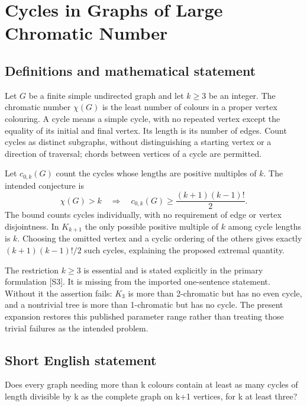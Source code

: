 \documentclass[11pt,a4paper]{article}
\begin{document}
\section*{Cycles in Graphs of Large Chromatic Number}\label{statement}

\subsection{Definitions and mathematical statement}
Let $G$ be a finite simple undirected graph and let $k\ge3$ be an integer.
The chromatic number $\chi(G)$ is the least number of colours in a proper
vertex colouring. A cycle means a simple cycle, with no repeated vertex
except the equality of its initial and final vertex. Its length is its
number of edges. Count cycles as distinct subgraphs, without distinguishing
a starting vertex or a direction of traversal; chords between vertices
of a cycle are permitted.

Let $c_{0,k}(G)$ count the cycles whose lengths are positive multiples of
$k$. The intended conjecture is
\[
 \chi(G)>k\quad\Longrightarrow\quad
 c_{0,k}(G)\ge\frac{(k+1)(k-1)!}{2}.
\]
The bound counts cycles individually, with no requirement of edge or
vertex disjointness. In $K_{k+1}$ the only possible positive multiple of
$k$ among cycle lengths is $k$. Choosing the omitted vertex and a cyclic
ordering of the others gives exactly $(k+1)(k-1)!/2$ such cycles, explaining
the proposed extremal quantity.

The restriction $k\ge3$ is essential and is stated explicitly in the
primary formulation [S3]. It is missing from the imported one-sentence
statement. Without it the assertion fails: $K_3$ is more than
2-chromatic but has no even cycle, and a nontrivial tree is more than
1-chromatic but has no cycle. The present expansion restores this
published parameter range rather than treating those trivial failures
as the intended problem.
\subsection{Short English statement}
Does every graph needing more than k colours contain at least as many cycles of length divisible by k as the complete graph on k+1 vertices, for k at least three?
\end{document}
